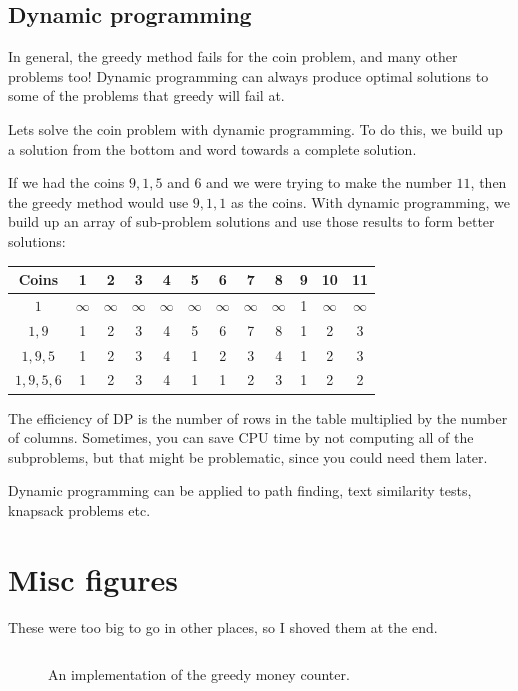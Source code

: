 \subsection{Dynamic programming}

In general, the greedy method fails for the coin problem, and many other
problems too! Dynamic programming can always produce optimal solutions to some
of the problems that greedy will fail at.

Lets solve the coin problem with dynamic programming. To do this, we build up a
solution from the bottom and word towards a complete solution.

If we had the coins $9,1,5$ and $6$ and we were trying to make the number $11$,
then the greedy method would use $9,1,1$ as the coins. With dynamic programming,
we build up an array of sub-problem solutions and use those results to form
better solutions:

\begin{tabular}{c | c c c c c c c c c c c}
  Coins & 1 & 2 & 3 & 4 & 5 & 6 & 7 & 8 & 9 & 10 & 11\\ \hline
  $1$   & $\infty$ & $\infty$ & $\infty$ & $\infty$ & $\infty$ & $\infty$ & $\infty$ & $\infty$ & 1 & $\infty$ & $\infty$ \\
  $1,9$ & 1 & 2 & 3 & 4 & 5 & 6 & 7 & 8 & 1 & 2 & 3\\
  $1,9,5$ & 1 & 2 & 3 & 4 & 1 & 2 & 3 & 4 & 1 & 2 & 3\\
  $1,9,5,6$ & 1 & 2 & 3 & 4 & 1 & 1 & 2 & 3 & 1 & 2 & 2\\
\end{tabular}

The efficiency of DP is the number of rows in the table multiplied by the number
of columns. Sometimes, you can save CPU time by not computing all of the
subproblems, but that might be problematic, since you could need them later.

Dynamic programming can be applied to path finding, text similarity tests,
knapsack problems etc.

\section{Misc figures}

These were too big to go in other places, so I shoved them at the end.

\begin{figure}[H]
  \label{greedy}
  \inputminted{java}{code/Greedy/Greedy.java}
  \caption{An implementation of the greedy money counter.}
\end{figure}